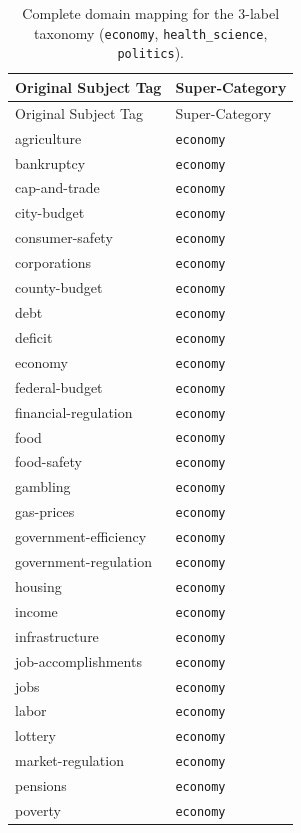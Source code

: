 \begin{longtable}{ll}
\caption[Complete domain mapping for the 3-label taxonomy.]{Complete domain mapping for the 3-label taxonomy (\texttt{economy}, \texttt{health\_science}, \texttt{politics}).}
\label{tab:domain_mapping_3}\\
\toprule
Original Subject Tag & Super-Category \\
\midrule
\endfirsthead
\toprule
Original Subject Tag & Super-Category \\
\midrule
\endhead
\bottomrule
\endfoot
agriculture & \texttt{economy} \\
bankruptcy & \texttt{economy} \\
cap-and-trade & \texttt{economy} \\
city-budget & \texttt{economy} \\
consumer-safety & \texttt{economy} \\
corporations & \texttt{economy} \\
county-budget & \texttt{economy} \\
debt & \texttt{economy} \\
deficit & \texttt{economy} \\
economy & \texttt{economy} \\
federal-budget & \texttt{economy} \\
financial-regulation & \texttt{economy} \\
food & \texttt{economy} \\
food-safety & \texttt{economy} \\
gambling & \texttt{economy} \\
gas-prices & \texttt{economy} \\
government-efficiency & \texttt{economy} \\
government-regulation & \texttt{economy} \\
housing & \texttt{economy} \\
income & \texttt{economy} \\
infrastructure & \texttt{economy} \\
job-accomplishments & \texttt{economy} \\
jobs & \texttt{economy} \\
labor & \texttt{economy} \\
lottery & \texttt{economy} \\
market-regulation & \texttt{economy} \\
pensions & \texttt{economy} \\
poverty & \texttt{economy} \\

\end{longtable}
